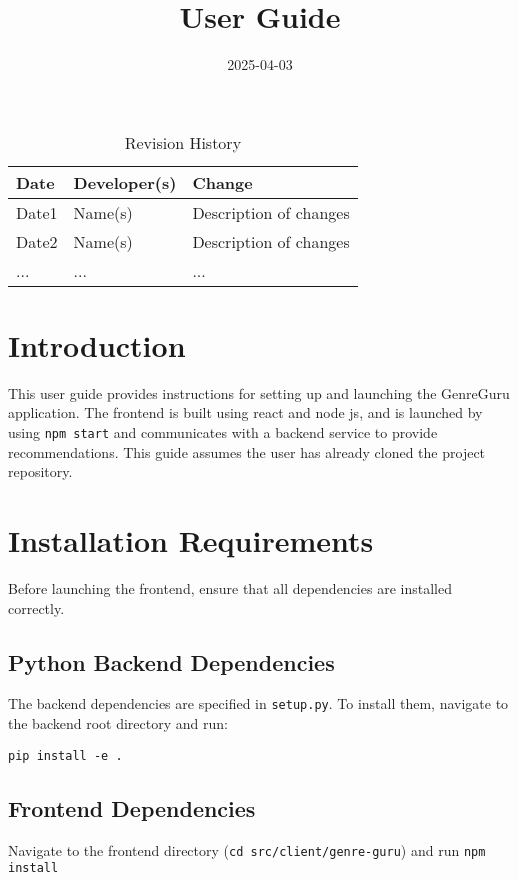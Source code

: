 \documentclass{article}
\title{User Guide\\\progname}
\author{\authname}
\date{2025-04-03}
\begin{document}
\begin{table}[hp]
\caption{Revision History} \label{TblRevisionHistory}
\begin{tabularx}{\textwidth}{llX}
\toprule
\textbf{Date} & \textbf{Developer(s)} & \textbf{Change}\\
\midrule
Date1 & Name(s) & Description of changes\\
Date2 & Name(s) & Description of changes\\
... & ... & ...\\
\bottomrule
\end{tabularx}  
\end{table}

\newpage

\maketitle
\tableofcontents
\newpage

\section{Introduction}
This user guide provides instructions for setting up and launching the GenreGuru application.
The frontend is built using react and node js, and is launched by using \texttt{npm start} and communicates with a backend service to provide recommendations. 
This guide assumes the user has already cloned the project repository.

\section{Installation Requirements}
Before launching the frontend, ensure that all dependencies are installed correctly.

\subsection{Python Backend Dependencies}
The backend dependencies are specified in \texttt{setup.py}. To install them, navigate to the backend root directory and run:

\begin{verbatim}
pip install -e .
\end{verbatim}

\subsection{Frontend Dependencies}
Navigate to the frontend directory (\texttt{cd src/client/genre-guru}) and run \texttt{npm install}
\end{document}
